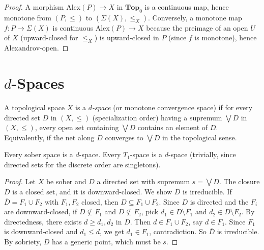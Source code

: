 \begin{proof}
A morphism $\mathrm{Alex}(P) \to X$ in $\mathbf{Top}_0$ is a continuous map, hence
monotone from $(P,\leq)$ to $(\Sigma(X), \leq_X)$. Conversely, a monotone map
$f\colon P \to \Sigma(X)$ is continuous $\mathrm{Alex}(P) \to X$ because the preimage of
an open $U$ of $X$ (upward-closed for $\leq_X$) is upward-closed in $P$ (since $f$ is
monotone), hence Alexandrov-open.
\end{proof}

\section{$d$-Spaces}

\begin{definition}[$d$-space]
A topological space $X$ is a \emph{$d$-space} (or monotone convergence space) if for every
directed set $D$ in $(X, \leq)$ (specialization order) having a supremum $\bigvee D$ in
$(X,\leq)$, every open set containing $\bigvee D$ contains an element of $D$.
Equivalently, if the net along $D$ converges to $\bigvee D$ in the topological sense.
\end{definition}

\begin{theorem}
Every sober space is a $d$-space. Every $T_1$-space is a $d$-space (trivially, since
directed sets for the discrete order are singletons).
\end{theorem}

\begin{proof}
Let $X$ be sober and $D$ a directed set with supremum $s = \bigvee D$. The closure
$\overline{D}$ is a closed set, and it is downward-closed. We show $\overline{D}$ is
irreducible. If $\overline{D} = F_1 \cup F_2$ with $F_1, F_2$ closed, then
$D \subseteq F_1 \cup F_2$. Since $D$ is directed and the $F_i$ are downward-closed, if
$D \not\subseteq F_1$ and $D \not\subseteq F_2$, pick $d_1 \in D \setminus F_1$ and
$d_2 \in D \setminus F_2$. By directedness, there exists $d \geq d_1, d_2$ in $D$. Then
$d \in F_1 \cup F_2$, say $d \in F_1$. Since $F_1$ is downward-closed and $d_1 \leq d$,
we get $d_1 \in F_1$, contradiction. So $\overline{D}$ is irreducible. By sobriety,
$\overline{D}$ has a generic point, which must be $s$.
\end{proof}

